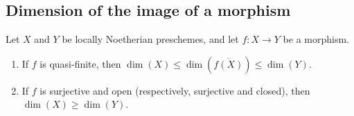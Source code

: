 \subsection{Dimension of the image of a morphism}
\label{subsection:IV.5.4}

\begin{proposition}[5.4.1]
\label{IV.5.4.1}
Let $X$ and $Y$ be locally Noetherian preschemes, and let
$f:X\to Y$ be a morphism.
\begin{enumerate}[{\rm(i)}]
\item
{}
\label{IV.5.4.1.i}
If $f$ is quasi-finite, then $\dim(X)\leq\dim(\overline{f(X)})\leq\dim(Y)$.
\item
{}
\label{IV.5.4.1.ii}
If $f$ is surjective and open \textup{(respectively,} surjective and closed\textup{)},
then $\dim(X)\geq\dim(Y)$.
\end{enumerate}
\end{proposition}


